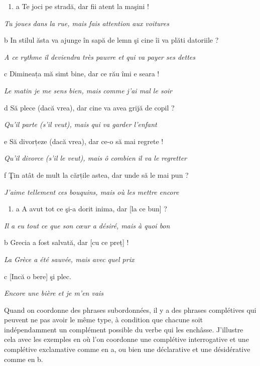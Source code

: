 \begin{enumerate}
\item \label{bkm:Ref273567144}a  Te joci pe stradă, dar fii atent la maşini !


\end{enumerate}
{\itshape
Tu joues dans la rue, mais fais attention aux voitures}

  b  In stilul ăsta va ajunge în sapă de lemn şi cine îi va plăti datoriile ?

{\itshape
A ce rythme il deviendra très pauvre et qui va payer ses dettes} 

  c  Dimineața mă simt bine, dar ce rău îmi e seara !

{\itshape
Le matin je me sens bien, mais comme j'ai mal le soir}

  d  Să plece (dacă vrea), dar cine va avea grijă de copil ?

{\itshape
Qu'il parte (s'il veut), mais qui va garder l'enfant}

  e  Să divorțeze (dacă vrea), dar ce-o să mai regrete !

{\itshape
Qu'il divorce (s'il le veut), mais ô combien il va le regretter}

  f  \c{T}in atât de mult la cărțile astea, dar unde să le mai pun ?

{\itshape
J'aime tellement ces bouquins, mais où les mettre encore}


\begin{enumerate}
\item \label{bkm:Ref269903039}a  A avut tot ce şi-a dorit inima, dar [la ce bun] ?


\end{enumerate}
{\itshape
Il a eu tout ce que son c{\oe}ur a désiré, mais à quoi bon}

  b  Grecia a fost salvată, dar [cu ce preț] !

{\itshape
La Grèce a été sauvée, mais avec quel prix} 

  c  [Incă o bere] şi plec.

{\itshape
Encore une bière et je m'en vais}

Quand on coordonne des phrases subordonnées, il y a des phrases complétives qui peuvent ne pas avoir le même type, à condition que chacune soit indépendamment un complément possible du verbe qui les enchâsse. J'illustre cela avec les exemples en  où l'on coordonne une complétive interrogative et une complétive exclamative comme en a, ou bien une déclarative et une désidérative comme en b.


